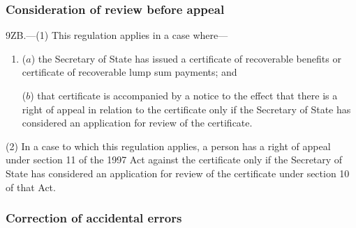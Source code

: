\documentclass[12pt,a4paper]{article}
\begin{document}

\subsubsection[9ZB. Consideration of review before appeal]{Consideration of review before appeal}

9ZB.---(1)  This regulation applies in a case where—
\begin{enumerate}\item[]
($a$) the Secretary of State has issued a certificate of recoverable benefits or certificate of recoverable lump sum payments; and

($b$) that certificate is accompanied by a notice to the effect that there is a right of appeal in relation to the certificate only if the Secretary of State has considered an application for review of the certificate.
\end{enumerate}

(2) In a case to which this regulation applies, a person has a right of appeal under section 11 of the 1997 Act against the certificate only if the Secretary of State has considered an application for review of the certificate under section 10 of that Act.


\subsubsection[9A. Correction of accidental errors]{Correction of accidental errors}
\end{document}

